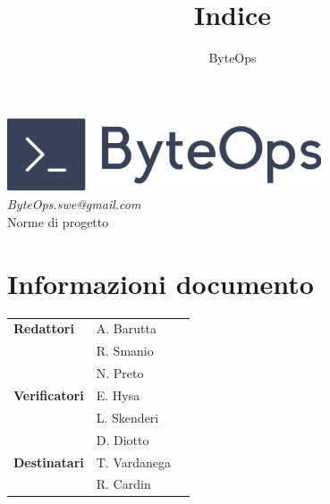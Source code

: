 \documentclass{article}
\title{\textbf{\fontsize{28}{6}\selectfont Indice}}
\author{\fontsize{14}{6}\selectfont ByteOps}
\date{}
\begin{document}
\pagestyle{fancy}
\begin{center}
    \includegraphics[width = 0.7\textwidth]{../Images/logo.png} \\
    \vspace{0.2cm}
    \textcolor[RGB]{60, 60, 60}{\textit{ByteOps.swe@gmail.com}} \\
    \vspace{2cm}
    \fontsize{16}{6}\selectfont Norme di progetto \\
    \vspace{0.5cm}
\end{center}

\section*{Informazioni documento}
\def\arraystretch{1.2}
\begin{tabular}{>{\raggedleft\arraybackslash}p{}|>{\raggedright\arraybackslash}p{}c}
    \hline
    \addlinespace
    \textbf{Redattori}      & A. Barutta             \\ & R. Smanio \\ & N. Preto \vspace{10pt} \\
    \textbf{Verificatori}   & E. Hysa                \\ & L. Skenderi \\ & D. Diotto \vspace{10pt} \\
    \textbf{Destinatari}    & T. Vardanega           \\ & R. Cardin \vspace{10pt} \\
\end{tabular}
\pagebreak

\end{document}
